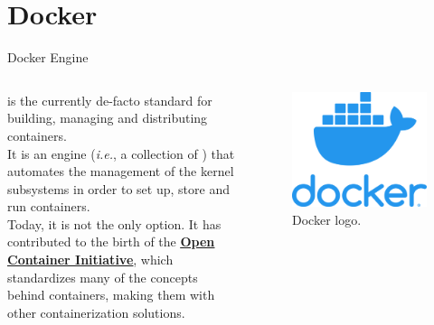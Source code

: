 
\section{Docker}
\graphicspath{{figs/section2/}}

\begin{frame}{Docker Engine}
	\begin{columns}
		 is the currently de-facto standard for building, managing and distributing  containers.\\
		\bigskip
		It is an engine (\emph{i.e.}, a collection of ) that automates the management of the kernel subsystems in order to set up, store and run containers.\\
    \bigskip
    Today, it is not the only option. It has contributed to the birth of the \href{https://opencontainers.org/}{\color{blue}\underline{\textbf{Open Container Initiative}}}, which standardizes many of the concepts behind containers, making them  with other containerization solutions.

		\begin{figure}
			\centering
			\label{fig:docker}
			\includegraphics[scale=.2]{docker.png}
			\caption{Docker logo.}
		\end{figure}
	\end{columns}
\end{frame}
